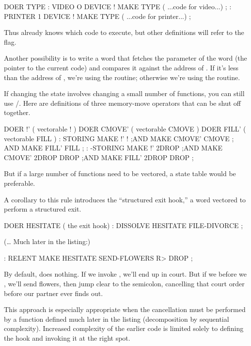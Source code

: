 \begin{Code}
DOER TYPE
: VIDEO   O DEVICE !  MAKE TYPE
     ( ...code for video...) ;
: PRINTER   1 DEVICE !  MAKE TYPE
     ( ...code for printer...) ;
\end{Code}
Thus  already knows which code to execute, but other definitions
will refer to the flag.

Another possibility is to write a word that fetches the parameter of
the  word  (the pointer to the current code) and compares it
against the address of . If it's less than the address of
, we're using the  routine; otherwise we're using the
 routine.

If changing the state involves changing a small number of functions,
you can still use /. Here are definitions of three
memory-move operators that can be shut off together.

\begin{Code}
DOER !'  ( vectorable ! )
DOER CMOVE'  ( vectorable CMOVE )
DOER FILL'  ( vectorable FILL )
: STORING   MAKE !' ! ;AND
            MAKE CMOVE'  CMOVE ; AND
            MAKE FILL'  FILL ;
: -STORING  MAKE !'  2DROP ;AND
            MAKE CMOVE'  2DROP DROP ;AND
            MAKE FILL'  2DROP DROP ;
\end{Code}
But if a large number of functions need to be vectored, a state table
would be preferable.

A corollary to this rule introduces the ``structured exit hook,'' a
 word vectored to perform a structured exit.

\begin{Code}
DOER HESITATE  ( the exit hook)
: DISSOLVE   HESITATE  FILE-DIVORCE ;
\end{Code}
(\dots{} Much later in the listing:)
\begin{Code}
: RELENT   MAKE HESITATE   SEND-FLOWERS  R> DROP ;
\end{Code}
By default,  does nothing. If we invoke , we'll
end up in court. But if we  before we , we'll send
flowers, then jump clear to the semicolon, cancelling that court order
before our partner ever finds out.

This approach is especially appropriate when the cancellation must
be performed by a function defined much later in the listing (decomposition
by sequential complexity). Increased complexity of the earlier code is
limited solely to defining the hook and invoking it at the right spot.%

